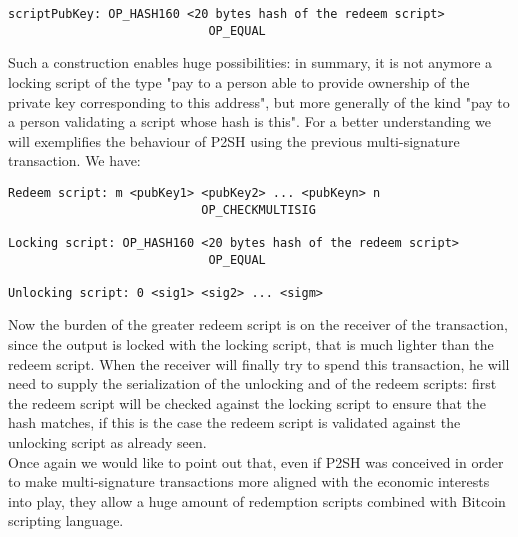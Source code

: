 \bigskip

\begin{lstlisting}[frame=single]
scriptPubKey: OP_HASH160 <20 bytes hash of the redeem script> 
							OP_EQUAL
\end{lstlisting}

\bigskip
\noindent
Such a construction enables huge possibilities: in summary, it is not anymore a locking script of the type "pay to a person able to provide ownership of the private key corresponding to this address", but more generally of the kind "pay to a person validating a script whose hash is this".
For a better understanding we will exemplifies the behaviour of P2SH using the previous multi-signature transaction.
We have:

\bigskip

\begin{lstlisting}[frame=single]
Redeem script: m <pubKey1> <pubKey2> ... <pubKeyn> n
 						   OP_CHECKMULTISIG
 						   
Locking script: OP_HASH160 <20 bytes hash of the redeem script> 
						    OP_EQUAL
						    
Unlocking script: 0 <sig1> <sig2> ... <sigm>
\end{lstlisting}

\bigskip
\noindent
Now the burden of the greater redeem script is on the receiver of the transaction, since the output is locked with the locking script, that is much lighter than the redeem script. When the receiver will finally try to spend this transaction, he will need to supply the serialization of the unlocking and of the redeem scripts: first the redeem script will be checked against the locking script to ensure that the hash matches, if this is the case the redeem script is validated against the unlocking script as already seen.
\\
Once again we would like to point out that, even if P2SH was conceived in order to make multi-signature transactions more aligned with the economic interests into play, they allow a huge amount of redemption scripts combined with Bitcoin scripting language.